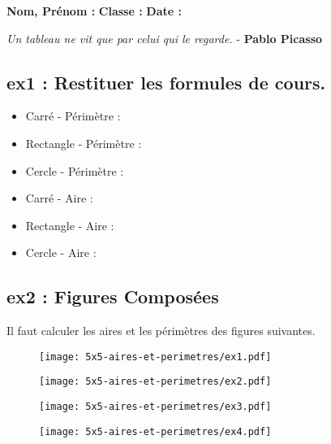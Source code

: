 



\textbf{Nom, Prénom :} \hspace{8cm} \textbf{Classe :} \hspace{3cm} \textbf{Date :}\\

\begin{center}
  \textit{Un tableau ne vit que par celui qui le regarde.}  - \textbf{Pablo Picasso}
\end{center}

\subsection*{ex1 : Restituer les formules de cours.}

\begin{multicols}{2}
\begin{itemize}
  \item Carré - Périmètre :\dotfill 
  \item Rectangle - Périmètre : \dotfill 
  \item Cercle - Périmètre : \dotfill
  \item Carré - Aire : \dotfill 
  \item Rectangle - Aire : \dotfill 
  \item Cercle - Aire : \dotfill
\end{itemize}
\end{multicols}

\subsection*{ex2 : Figures Composées}
Il faut calculer les aires et les périmètres des figures suivantes. 

\begin{multicols}{2}
  \begin{figure}[H]
    \centering
    \texttt{[image: 5x5-aires-et-perimetres/ex1.pdf]}
  \end{figure}

  \begin{figure}[H]
    \centering
    \texttt{[image: 5x5-aires-et-perimetres/ex2.pdf]}
  \end{figure}
\end{multicols}

\Pointilles[26]

\newpage


\begin{multicols}{2}
   \begin{figure}[H]
    \centering
    \texttt{[image: 5x5-aires-et-perimetres/ex3.pdf]}
  \end{figure}
  
  \begin{figure}[H]
    \centering
    \texttt{[image: 5x5-aires-et-perimetres/ex4.pdf]}
  \end{figure}
  
\end{multicols}

\Pointilles[37]




